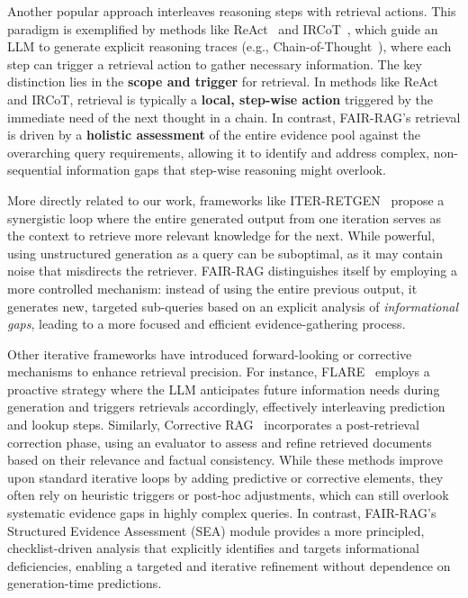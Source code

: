 \documentclass[11pt]{article}
\begin{document}
Another popular approach interleaves reasoning steps with retrieval actions. This paradigm is exemplified by methods like ReAct~\cite{yao2022react} and IRCoT~\cite{trivedi2023interleavingretrievalchainofthoughtreasoning}, which guide an LLM to generate explicit reasoning traces (e.g., Chain-of-Thought~\cite{wei2022chain}), where each step can trigger a retrieval action to gather necessary information. The key distinction lies in the \textbf{scope and trigger} for retrieval. In methods like ReAct and IRCoT, retrieval is typically a \textbf{local, step-wise action} triggered by the immediate need of the next thought in a chain. In contrast, FAIR-RAG's retrieval is driven by a \textbf{holistic assessment} of the entire evidence pool against the overarching query requirements, allowing it to identify and address complex, non-sequential information gaps that step-wise reasoning might overlook.

More directly related to our work, frameworks like ITER-RETGEN~\cite{shao2023iter} propose a synergistic loop where the entire generated output from one iteration serves as the context to retrieve more relevant knowledge for the next. While powerful, using unstructured generation as a query can be suboptimal, as it may contain noise that misdirects the retriever. FAIR-RAG distinguishes itself by employing a more controlled mechanism: instead of using the entire previous output, it generates new, targeted sub-queries based on an explicit analysis of \emph{informational gaps}, leading to a more focused and efficient evidence-gathering process.

Other iterative frameworks have introduced forward-looking or corrective mechanisms to enhance retrieval precision. For instance, FLARE~\cite{jiang2023flare} employs a proactive strategy where the LLM anticipates future information needs during generation and triggers retrievals accordingly, effectively interleaving prediction and lookup steps. Similarly, Corrective RAG~\cite{yan2024corrective} incorporates a post-retrieval correction phase, using an evaluator to assess and refine retrieved documents based on their relevance and factual consistency. While these methods improve upon standard iterative loops by adding predictive or corrective elements, they often rely on heuristic triggers or post-hoc adjustments, which can still overlook systematic evidence gaps in highly complex queries. In contrast, FAIR-RAG's Structured Evidence Assessment (SEA) module provides a more principled, checklist-driven analysis that explicitly identifies and targets informational deficiencies, enabling a targeted and iterative refinement without dependence on generation-time predictions.
\end{document}
